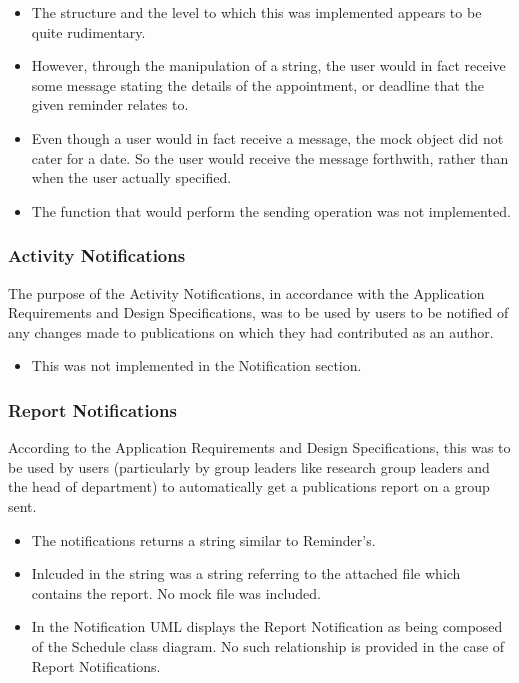 \documentclass[a4paper,10pt]{article}
\begin{document}
\begin{itemize}
	\item The structure and the level to which this was implemented appears to be quite rudimentary.
	\item However, through the manipulation of a string, the user would in fact receive some message stating the details of the appointment, or deadline that the given reminder relates to.
	\item Even though a user would in fact receive a message, the mock object did not cater for a date. So the user would receive the message forthwith, rather than when the user actually specified.
	\item The function that would perform the sending operation was not implemented.
\end{itemize}
\subsubsection{Activity Notifications}
The purpose of the Activity Notifications, in accordance with the Application Requirements and Design Specifications, was to be used by users to be notified of any changes made to publications on which they had contributed as an author.

\begin{itemize}
	\item This was not implemented in the Notification section.
\end{itemize}
\subsubsection{Report Notifications}
According to the Application Requirements and Design Specifications, this was to be used by users (particularly by group leaders like research group leaders and the head of department) to automatically get a publications report on a group sent.

\begin{itemize}
	\item The notifications returns a string similar to Reminder's.
	\item Inlcuded in the string was a string referring to the attached file which contains the report. No mock file was included.
	\item In the Notification UML displays the Report Notification as being composed of the Schedule class diagram. No such relationship is provided in the case of Report Notifications.
\end{itemize}
\end{document}
